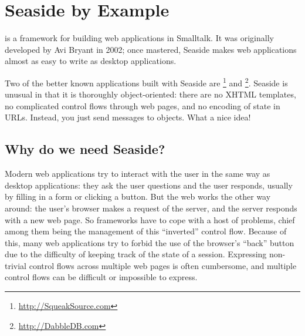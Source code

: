 \documentclass[a4paper,10pt,twoside]{book}
\begin{document}
	\sloppy
\fi
\chapter{Seaside by Example}


 is a framework for building web applications in Smalltalk.  It was originally developed by Avi Bryant  in 2002; once mastered, Seaside makes web applications almost as easy to write as desktop applications.

Two of the better known applications built with Seaside are \footnote{\url{http://SqueakSource.com}} and \footnote{\url{http://DabbleDB.com}}.
Seaside is unusual in that it is thoroughly object-oriented: there are no XHTML templates, no complicated control flows through web pages, and no encoding of state in URLs. Instead, you just send messages to objects.  What a nice idea!

\section{Why do we need Seaside?}

Modern web applications try to interact with the user in the same way as desktop applications: they ask the user questions and the user responds, usually by filling in a form or clicking a button.
But the web works the other way around: the user's browser makes a request of the server, and the server responds with a new web page.
So  frameworks have to cope with a host of problems, chief among them being the management of this ``inverted'' control flow. 
Because of this, many web applications try to forbid the use of the browser's ``back'' button due to the difficulty of keeping track of the state of a session. 
Expressing non-trivial control flows across multiple web pages is often cumbersome, and multiple control flows can be difficult or impossible to express.

\end{document}
